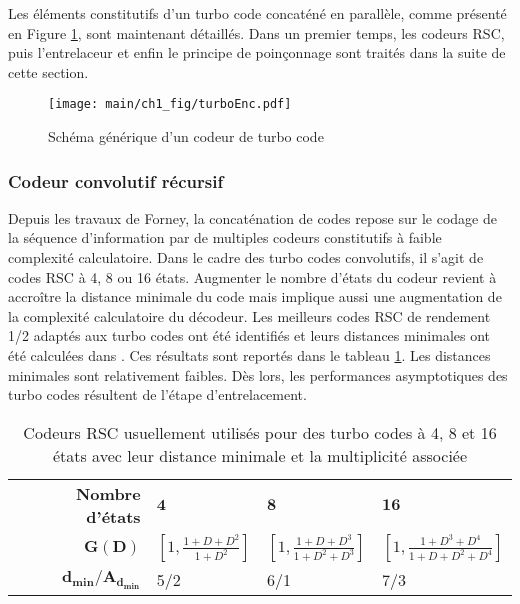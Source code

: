 Les éléments constitutifs d'un turbo code concaténé en parallèle, comme présenté en Figure \ref{fig:turboEnc}, sont 
maintenant détaillés. Dans un premier temps, les codeurs RSC, puis l'entrelaceur et enfin le principe de poinçonnage sont 
traités dans la suite de cette section.

\begin{figure}[!h]
	\centering
	\texttt{[image: main/ch1\_fig/turboEnc.pdf]}
	\caption{\label{fig:turboEnc} Schéma générique d'un codeur de turbo code}
\end{figure}


\subsubsection{Codeur convolutif récursif}
Depuis les travaux de Forney, la concaténation de codes repose sur le codage de la séquence d'information par de multiples codeurs 
constitutifs à faible complexité calculatoire. Dans le cadre des turbo codes convolutifs, il s'agit de codes RSC à 4, 8 ou 16 états.
Augmenter le nombre d'états du codeur revient à accroître la distance minimale du code mais implique aussi une augmentation 
de la complexité calculatoire du décodeur. Les meilleurs codes RSC de rendement 1/2 adaptés aux turbo codes ont été identifiés 
et leurs distances minimales ont été calculées dans \cite{RSCdist}. Ces résultats sont reportés dans le tableau \ref{tab:bestRSC}. 
Les distances minimales sont relativement faibles. Dès lors, les performances asymptotiques des turbo codes résultent de l'étape 
d'entrelacement. 

\begin{table}[h]
	\centering
	\renewcommand{\arraystretch}{1.4}
	\begin{tabular}{rlll}
		\toprule
		\textbf{Nombre d'états}       & $\mathbf{4}$                           & $\mathbf{8}$                               & $\mathbf{16}$                                  \\ 
		\cmidrule(l){2-2} \cmidrule(l){3-3} \cmidrule(l){4-4}
		$\mathbf{G(D)}$                & $\left[1,\frac{1+D+D^2}{1+D^2}\right]$ & $\left[1,\frac{1+D+D^3}{1+D^2+D^3}\right]$ & $\left[1,\frac{1+D^3+D^4}{1+D+D^2+D^4}\right]$ \\
		$\mathbf{d_{min}/A_{d_{min}}}$ & 5/2                                    & 6/1                                        & 7/3                                            \\ \bottomrule
	\end{tabular}
	\caption{Codeurs RSC usuellement utilisés pour des turbo codes à 4, 8 et 16 états avec leur distance minimale et la multiplicité associée}
	\label{tab:bestRSC}
\end{table}

